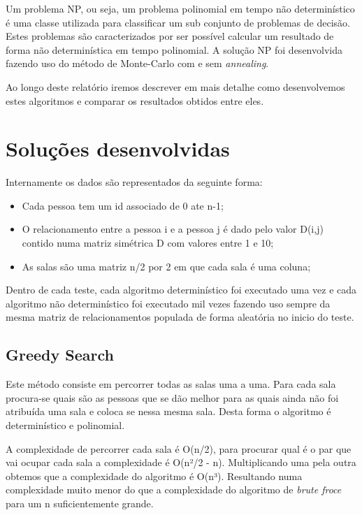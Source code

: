 \documentclass[a4paper]{report}
\begin{document}
Um problema NP, ou seja, um problema polinomial em tempo não determinístico é
uma classe utilizada para classificar um sub conjunto de problemas de decisão.
Estes problemas são caracterizados por ser possível calcular um resultado de
forma não determinística em tempo polinomial. A solução NP foi desenvolvida
fazendo uso do método de Monte-Carlo com e sem \textit{annealing}.

Ao longo deste relatório iremos descrever em mais detalhe como desenvolvemos
estes algoritmos e comparar os resultados obtidos entre eles.

\chapter{Soluções desenvolvidas}


Internamente os dados são representados da seguinte forma:
\begin{itemize}
    \item Cada pessoa tem um id associado de 0 ate n-1;
    \item O relacionamento entre a pessoa i e a pessoa j é dado pelo valor
        D(i,j) contido numa matriz simétrica D com valores entre 1 e 10;
    \item As salas são uma matriz n/2 por 2 em que cada sala é uma coluna;
\end{itemize}

Dentro de cada teste, cada algoritmo determinístico foi executado uma vez e cada
algoritmo não determinístico foi executado mil vezes fazendo uso sempre da mesma
matriz de relacionamentos populada de forma aleatória no inicio do teste.

\section{Greedy Search}

Este método consiste em percorrer todas as salas uma a uma. Para cada sala
procura-se quais são as pessoas que se dão melhor para as quais ainda não foi
atribuída uma sala e coloca se nessa mesma sala. Desta forma o algoritmo é
determinístico e polinomial.

A complexidade de percorrer cada sala é O(n/2), para procurar qual é o par que
vai ocupar cada sala a complexidade é O(n²/2 - n). Multiplicando uma pela outra
obtemos que a complexidade do algoritmo é O(n³). Resultando numa complexidade
muito menor do que a complexidade do algoritmo de \textit{brute froce} para um n
suficientemente grande.
\end{document}
